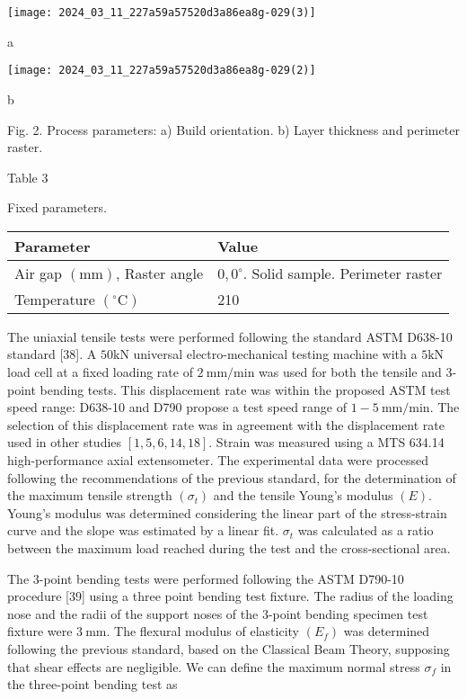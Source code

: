 \documentclass[10pt]{article}
\begin{document}
\begin{center}
\texttt{[image: 2024\_03\_11\_227a59a57520d3a86ea8g-029(3)]}
\end{center}

a

\begin{center}
\texttt{[image: 2024\_03\_11\_227a59a57520d3a86ea8g-029(2)]}
\end{center}

b

Fig. 2. Process parameters: a) Build orientation. b) Layer thickness and perimeter raster.

Table 3

Fixed parameters.

\begin{center}
\begin{tabular}{ll}
\hline
Parameter & Value \\
\hline
Air gap $(\mathrm{mm})$, Raster angle & $0,0^{\circ}$. Solid sample. Perimeter raster \\
Temperature $\left({ }^{\circ} \mathrm{C}\right)$ & 210 \\
\hline
\end{tabular}
\end{center}

The uniaxial tensile tests were performed following the standard ASTM D638-10 standard [38]. A $50 \mathrm{kN}$ universal electro-mechanical testing machine with a $5 \mathrm{kN}$ load cell at a fixed loading rate of $2 \mathrm{~mm} / \mathrm{min}$ was used for both the tensile and 3-point bending tests. This displacement rate was within the proposed ASTM test speed range: D638-10 and D790 propose a test speed range of $1-5 \mathrm{~mm} / \mathrm{min}$. The selection of this displacement rate was in agreement with the displacement rate used in other studies $[1,5,6,14,18]$. Strain was measured using a MTS 634.14 high-performance axial extensometer. The experimental data were processed following the recommendations of the previous standard, for the determination of the maximum tensile strength $\left(\sigma_{t}\right)$ and the tensile Young's modulus $(E)$. Young's modulus was determined considering the linear part of the stress-strain curve and the slope was estimated by a linear fit. $\sigma_{t}$ was calculated as a ratio between the maximum load reached during the test and the cross-sectional area.

The 3-point bending tests were performed following the ASTM D790-10 procedure [39] using a three point bending test fixture. The radius of the loading nose and the radii of the support noses of the 3-point bending specimen test fixture were $3 \mathrm{~mm}$. The flexural modulus of elasticity $\left(E_{f}\right)$ was determined following the previous standard, based on the Classical Beam Theory, supposing that shear effects are negligible. We can define the maximum normal stress $\sigma_{f}$ in the three-point bending test as
\end{document}
